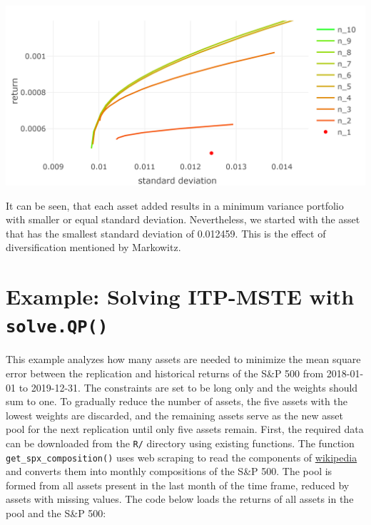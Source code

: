 \documentclass[
  oneside]{book}
\begin{document}
\includegraphics{Master_Thesis_files/figure-latex/qp_mvp4-1.png}

It can be seen, that each asset added results in a minimum variance portfolio with smaller or equal standard deviation. Nevertheless, we started with the asset that has the smallest standard deviation of 0.012459. This is the effect of diversification mentioned by Markowitz.

\hypertarget{exampleitpsolveqp}{%
\section{\texorpdfstring{Example: Solving ITP-MSTE with \texttt{solve.QP()}}{Example: Solving ITP-MSTE with solve.QP()}}\label{exampleitpsolveqp}}

This example analyzes how many assets are needed to minimize the mean square error between the replication and historical returns of the S\&P 500 from 2018-01-01 to 2019-12-31. The constraints are set to be long only and the weights should sum to one. To gradually reduce the number of assets, the five assets with the lowest weights are discarded, and the remaining assets serve as the new asset pool for the next replication until only five assets remain. First, the required data can be downloaded from the \texttt{R/} directory using existing functions. The function \texttt{get\_spx\_composition()} uses web scraping to read the components of \href{https://en.wikipedia.org/wiki/List_of_S\%26P_500_companies}{wikipedia} and converts them into monthly compositions of the S\&P 500. The pool is formed from all assets present in the last month of the time frame, reduced by assets with missing values. The code below loads the returns of all assets in the pool and the S\&P 500:
\end{document}
